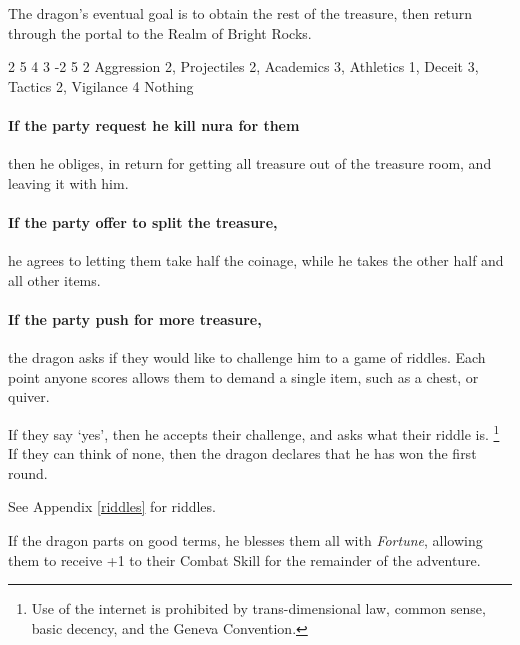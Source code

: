 \begin{multicols}{2}
The dragon's eventual goal is to obtain the rest of the treasure, then return through the portal to the Realm of Bright Rocks.

{2}%
{5}%
{{4}%
{3}%
{-2}}%
{5}%
{2}%
{Aggression 2, Projectiles 2, Academics 3, Athletics 1, Deceit 3, Tactics 2, Vigilance 4}%
{Nothing}%
{}

\paragraph{If the party request he kill nura for them}
then he obliges, in return for getting all treasure out of the treasure room, and leaving it with him.
\paragraph{If the party offer to split the treasure,}
he agrees to letting them take half the coinage, while he takes the other half and all other items.
\paragraph{If the party push for more treasure,}
the dragon asks if they would like to challenge him to a game of riddles.
Each point anyone scores allows them to demand a single item, such as a chest, or quiver.

If they say `yes', then he accepts their challenge, and asks what their riddle is.%
\footnote{Use of the internet is prohibited by trans-dimensional law, common sense, basic decency, and the Geneva Convention.}
If they can think of none,
then the dragon declares that he has won the first round.

See Appendix \ref{riddles} for riddles.

If the dragon parts on good terms, he blesses them all with \textit{Fortune}, allowing them to receive +1 to their Combat Skill for the remainder of the adventure.


\end{multicols}
